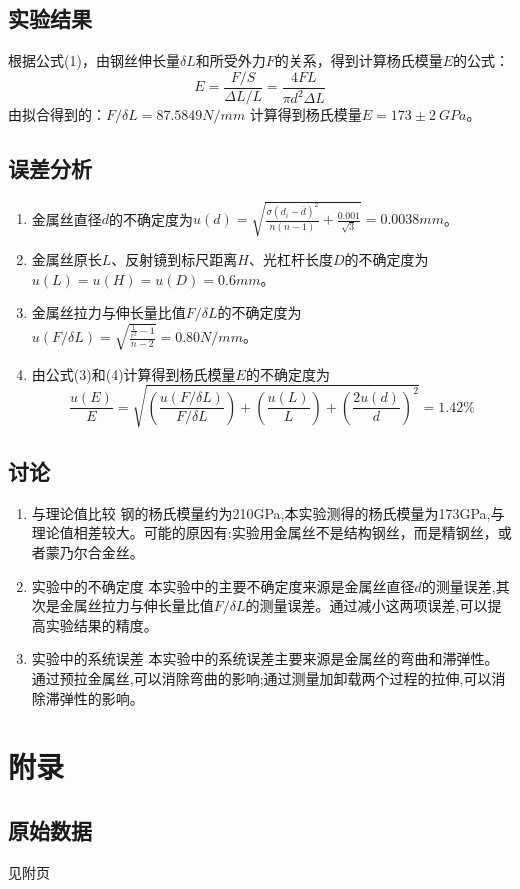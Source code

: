 \documentclass[UTF8]{ctexart}
\begin{document}
\subsection{实验结果}
根据公式(1)，由钢丝伸长量$\delta L$和所受外力$F$的关系，得到计算杨氏模量$E$的公式：
\begin{equation}
    E=\frac{F/S}{\Delta L/L}=\frac{4FL}{\pi d^2 \Delta L}
\end{equation}
由拟合得到的：$F/\delta L= 87.5849 N/mm$
计算得到杨氏模量$E=173 \pm 2 \ GPa$。
\subsection{误差分析}
\begin{enumerate}
    \item 金属丝直径$d$的不确定度为$u(d)=\sqrt{\frac{\sigma(d_i-\bar{d})^2}{n(n-1)}+\frac{0.001}{\sqrt{3}}}=0.0038mm$。
    \item 金属丝原长$L$、反射镜到标尺距离$H$、光杠杆长度$D$的不确定度为$u(L)=u(H)=u(D)=0.6mm$。
    \item 金属丝拉力与伸长量比值$F/\delta L$的不确定度为$u(F/\delta L)=\sqrt{\frac{\frac{1}{r^2}-1}{n-2}}=0.80N/mm$。
    \item 由公式(3)和(4)计算得到杨氏模量$E$的不确定度为
    \begin{equation}
    \frac{u(E)}{E}=\sqrt{(\frac{u(F/ \delta L)}{F/ \delta L})+(\frac{u(L)}{L})+(\frac{2u(d)}{d})^2}=1.42\%
    \end{equation}
\end{enumerate}
\subsection{讨论}
\begin{enumerate}
    \item 与理论值比较
    钢的杨氏模量约为210GPa,本实验测得的杨氏模量为173GPa,与理论值相差较大。可能的原因有:实验用金属丝不是结构钢丝，而是精钢丝，或者蒙乃尔合金丝。
    \item 实验中的不确定度
    本实验中的主要不确定度来源是金属丝直径$d$的测量误差,其次是金属丝拉力与伸长量比值$F/\delta L$的测量误差。通过减小这两项误差,可以提高实验结果的精度。
    \item 实验中的系统误差
    本实验中的系统误差主要来源是金属丝的弯曲和滞弹性。通过预拉金属丝,可以消除弯曲的影响;通过测量加卸载两个过程的拉伸,可以消除滞弹性的影响。
\end{enumerate}
\section{附录}
\subsection{原始数据}
见附页
\end{document}
